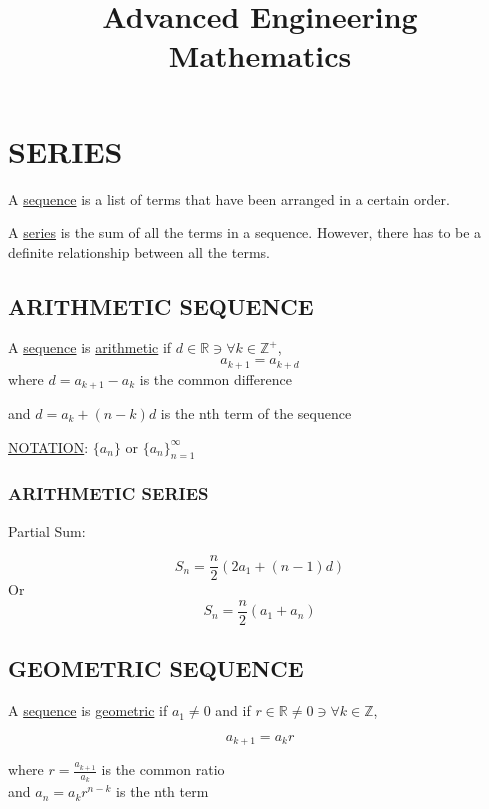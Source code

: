 \documentclass{article}
\author{}
\begin{document}
\raggedright



\title{Advanced Engineering Mathematics}

\date{\vspace{-5ex}}

\maketitle

\section{SERIES}
\indent A \underline{sequence} is a list of terms that have been arranged in a certain order.\medskip

\noindent A \underline{series} is the sum of all the terms in a sequence. However, there has to be a definite relationship
between all the terms.
\subsection{ARITHMETIC SEQUENCE}


A \underline{sequence} is \underline{arithmetic} if \({d} \in \mathbb{R} \ni \forall {k} \in \mathbb{Z}^{+} \), 
\[a_{k+1} = a_{k+d}\]
where \(d = a_{k+1} - a_k\) is the common difference

\noindent and \(d = a_k + (n-k)d\) is the nth term of the sequence\medskip


\noindent \underline{NOTATION}:
 $ \{ a_n \} $ or $ \{ a_n \}_{n=1}^{\infty}$ 

\subsubsection{ARITHMETIC SERIES}
Partial Sum:

\[ S_n = \frac{n}{2}(2a_1 + (n-1)d)\]
Or
\[ S_n = \frac{n}{2}(a_1 + a_n)\]

\subsection{GEOMETRIC SEQUENCE}

A \underline{sequence} is \underline{geometric} if \(a_1 \ne 0 \) and if \( {r} \in \mathbb{R} \ne 0 \ni \forall k \in \mathbb{Z}\),

\[a_{k+1} = a_{k} r\]

\noindent where \(r = \frac{a_{k+1}}{a_k}\) is the common ratio\\
and \(a_n = a_k r^{n-k}\) is the nth term
\end{document}
